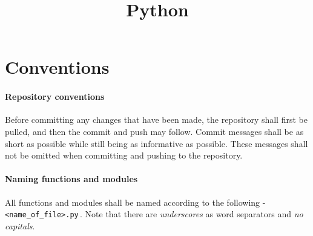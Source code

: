 \documentclass{article}
\title{Python}
\author{}
\date{}
\begin{document}
\maketitle
\section{Conventions}
\paragraph{Repository conventions} Before committing any changes that have been made, the repository shall first be pulled, and then the commit and push may follow. Commit messages shall be as short as possible while still being as informative as possible. These messages shall not be omitted when committing and pushing to the repository.
\paragraph{Naming functions and modules} All functions and modules shall be named according to the following - \verb{<name_of_file>.py{\,. Note that there are \emph{underscores} as word separators and \emph{no capitals}.
\end{document}
